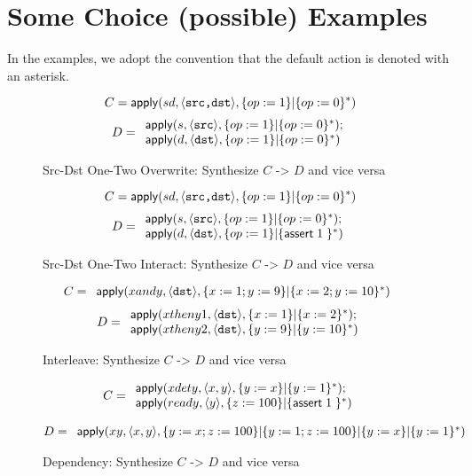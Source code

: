 \section{Some Choice (possible) Examples}

In the examples, we adopt the convention that the default action is
denoted with an asterisk.

\begin{figure}
  \[C = \mathsf{apply}(sd, \langle\texttt{src,dst}\rangle, \{op := 1\} | \{op:=0\}^*)\]
  \[D = \begin{array}{l}
  \mathsf{apply}(s, \langle\texttt{src}\rangle, \{op:=1\} | \{op:=0\}^*);
  \\ \mathsf{apply}(d, \langle\texttt{dst}\rangle, \{op:=1\} | \{op := 0\}^*)
  \end{array}\]
  \caption{Src-Dst One-Two Overwrite: Synthesize $C$ -> $D$ and vice versa}
\end{figure}

\begin{figure}
  \[C = \mathsf{apply}(sd, \langle\texttt{src,dst}\rangle, \{op := 1\} | \{op:=0\}^*)\]
  \[D = \begin{array}{l}
    \mathsf{apply}(s, \langle\texttt{src}\rangle, \{op:=1\} | \{op:=0\}^*);
    \\ \mathsf{apply}(d, \langle\texttt{dst}\rangle, \{op:=1\} | \{\mathsf{assert}\; 1\;\}^*)
  \end{array}\]
  \caption{Src-Dst One-Two Interact: Synthesize $C$ -> $D$ and vice versa}
\end{figure}

\begin{figure}
  \[C = \begin{array}l
    \apply{xandy, \langle\texttt{dst}\rangle, \{x := 1; y:= 9\} | \{x:= 2; y:=10\}^*} \\
  \end{array}
  \]
  \[D = \begin{array}{l}
    \mathsf{apply}(xtheny1, \langle\texttt{dst}\rangle, \{x:=1\} | \{x:=2\}^*);
    \\ \mathsf{apply}(xtheny2, \langle\texttt{dst}\rangle, \{y:=9\} | \{y:=10\}^*)
  \end{array}\]
  \caption{Interleave: Synthesize $C$ -> $D$ and vice versa}
\end{figure}


\begin{figure}
  \[C = \begin{array}l
    \apply{xdety, \langle x,y \rangle, \{y:=x\} | \{y:= 1\}^*}; \\
    \apply{ready, \langle y \rangle, \{z := 100\} | \{\assert \TRUE\}^*}
  \end{array}\]

  \[D = \begin{array}l
    \apply{xy, \langle x, y \rangle, \{y:= x;z:= 100\} | \{y:=1; z:=100\} | \{y:= x\} | \{y:=1\}^*}
    \end{array}\]
  
  \caption{Dependency: Synthesize $C$ -> $D$ and vice versa}
\end{figure}
